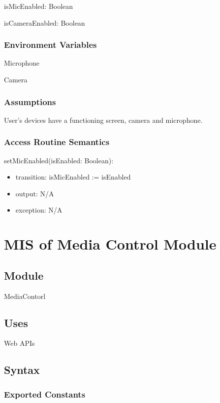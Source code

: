 \documentclass[12pt, titlepage]{article}
\begin{document}
\noindent isMicEnabled: Boolean

\noindent isCameraEnabled: Boolean

\subsubsection{Environment Variables}

\noindent Microphone

\noindent Camera

\subsubsection{Assumptions}

User's devices have a functioning screen, camera and microphone.

\subsubsection{Access Routine Semantics}

\noindent setMicEnabled(isEnabled: Boolean):
\begin{itemize}
\item transition: isMicEnabled := isEnabled
\item output: N/A
\item exception: N/A
\end{itemize}

\section{MIS of Media Control Module} \label{sec:mediactrl}

\subsection{Module}

MediaContorl

\subsection{Uses}

\noindent Web APIs

\subsection{Syntax}

\subsubsection{Exported Constants}
\end{document}
